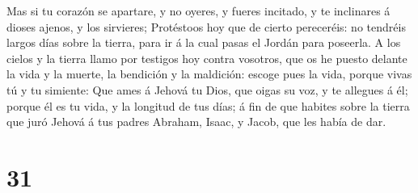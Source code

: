  Mas si tu corazón se apartare, y no oyeres, y fueres
incitado, y te inclinares á dioses ajenos, y los sirvieres;
 Protéstoos hoy que de cierto pereceréis: no tendréis
largos días sobre la tierra, para ir á la cual pasas el Jordán para
poseerla.  A los cielos y la tierra llamo por testigos
hoy contra vosotros, que os he puesto delante la vida y la muerte, la
bendición y la maldición: escoge pues la vida, porque vivas tú y tu
simiente:  Que ames á Jehová tu Dios, que oigas su voz, y
te allegues á él; porque él es tu vida, y la longitud de tus días; á fin
de que habites sobre la tierra que juró Jehová á tus padres Abraham,
Isaac, y Jacob, que les había de dar.

\hypertarget{section-30}{%
\section{31}\label{section-30}}

